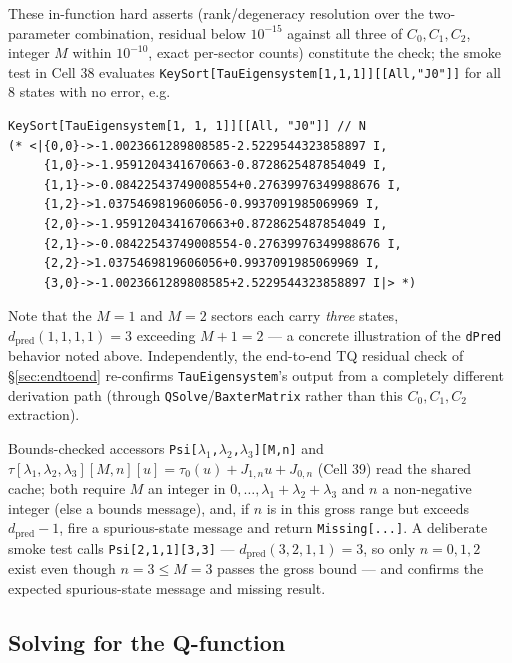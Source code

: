 \documentclass[11pt]{article}
\begin{document}
These in-function hard asserts (rank/degeneracy resolution over the two-parameter combination,
residual below $10^{-15}$ against all three of $C_0,C_1,C_2$, integer $M$ within $10^{-10}$, exact
per-sector counts) constitute the check; the smoke test in Cell 38 evaluates
\texttt{KeySort[TauEigensystem[1,1,1]][[All,"J0"]]} for all $8$ states with no error, e.g.
\begin{verbatim}
KeySort[TauEigensystem[1, 1, 1]][[All, "J0"]] // N
(* <|{0,0}->-1.0023661289808585-2.5229544323858897 I,
     {1,0}->-1.9591204341670663-0.8728625487854049 I,
     {1,1}->-0.08422543749008554+0.27639976349988676 I,
     {1,2}->1.0375469819606056-0.9937091985069969 I,
     {2,0}->-1.9591204341670663+0.8728625487854049 I,
     {2,1}->-0.08422543749008554-0.27639976349988676 I,
     {2,2}->1.0375469819606056+0.9937091985069969 I,
     {3,0}->-1.0023661289808585+2.5229544323858897 I|> *)
\end{verbatim}
Note that the $M=1$ and $M=2$ sectors each carry \emph{three} states, $d_{\mathrm{pred}}(1,1,1,1)=3$
exceeding $M+1=2$ --- a concrete illustration of the \texttt{dPred} behavior noted above.
Independently, the end-to-end TQ residual check of \S\ref{sec:endtoend} re-confirms
\texttt{TauEigensystem}'s output from a completely different derivation path (through
\texttt{QSolve}/\texttt{BaxterMatrix} rather than this $C_0,C_1,C_2$ extraction).

Bounds-checked accessors \texttt{Psi[$\lambda_1$,$\lambda_2$,$\lambda_3$][M,n]} and
$\tau[\lambda_1,\lambda_2,\lambda_3][M,n][u]=\tau_0(u)+J_{1,n}u+J_{0,n}$ (Cell 39) read the shared
cache; both require $M$ an integer in $0,\dots,\lambda_1+\lambda_2+\lambda_3$ and $n$ a non-negative
integer (else a bounds message), and, if $n$ is in this gross range but exceeds
$d_{\mathrm{pred}}-1$, fire a spurious-state message and return \texttt{Missing[...]}. A deliberate
smoke test calls \texttt{Psi[2,1,1][3,3]} --- $d_{\mathrm{pred}}(3,2,1,1)=3$, so only $n=0,1,2$ exist
even though $n=3\le M=3$ passes the gross bound --- and confirms the expected spurious-state message
and missing result.

\subsection*{Solving for the Q-function}
\end{document}
